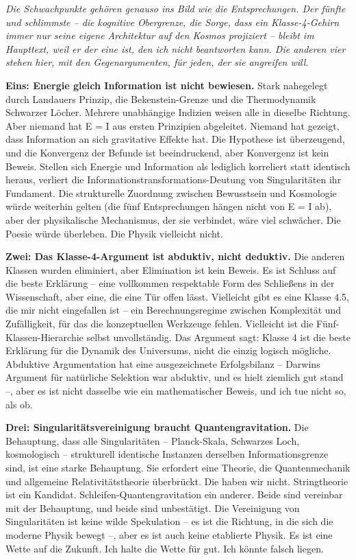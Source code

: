 \documentclass[11pt, twoside, openright]{book}
\begin{document}
\textit{Die Schwachpunkte gehören genauso ins Bild wie die Entsprechungen. Der fünfte und schlimmste -- die kognitive Obergrenze, die Sorge, dass ein Klasse-4-Gehirn immer nur seine eigene Architektur auf den Kosmos projiziert -- bleibt im Haupttext, weil er der eine ist, den ich nicht beantworten kann. Die anderen vier stehen hier, mit den Gegenargumenten, für jeden, der sie angreifen will.}

\textbf{Eins: Energie gleich Information ist nicht bewiesen.} Stark nahegelegt durch Landauers Prinzip, die Bekenstein-Grenze und die Thermodynamik Schwarzer Löcher. Mehrere unabhängige Indizien weisen alle in dieselbe Richtung. Aber niemand hat E = I aus ersten Prinzipien abgeleitet. Niemand hat gezeigt, dass Information an sich gravitative Effekte hat. Die Hypothese ist überzeugend, und die Konvergenz der Befunde ist beeindruckend, aber Konvergenz ist kein Beweis. Stellen sich Energie und Information als lediglich korreliert statt identisch heraus, verliert die Informationstransformations-Deutung von Singularitäten ihr Fundament. Die strukturelle Zuordnung zwischen Bewusstsein und Kosmologie würde weiterhin gelten (die fünf Entsprechungen hängen nicht von E = I ab), aber der physikalische Mechanismus, der sie verbindet, wäre viel schwächer. Die Poesie würde überleben. Die Physik vielleicht nicht.

\textbf{Zwei: Das Klasse-4-Argument ist abduktiv, nicht deduktiv.} Die anderen Klassen wurden eliminiert, aber Elimination ist kein Beweis. Es ist Schluss auf die beste Erklärung -- eine vollkommen respektable Form des Schließens in der Wissenschaft, aber eine, die eine Tür offen lässt. Vielleicht gibt es eine Klasse 4.5, die mir nicht eingefallen ist -- ein Berechnungsregime zwischen Komplexität und Zufälligkeit, für das die konzeptuellen Werkzeuge fehlen. Vielleicht ist die Fünf-Klassen-Hierarchie selbst unvollständig. Das Argument sagt: Klasse 4 ist die beste Erklärung für die Dynamik des Universums, nicht die einzig logisch mögliche. Abduktive Argumentation hat eine ausgezeichnete Erfolgsbilanz -- Darwins Argument für natürliche Selektion war abduktiv, und es hielt ziemlich gut stand --, aber es ist nicht dasselbe wie ein mathematischer Beweis, und ich tue nicht so, als ob.

\textbf{Drei: Singularitätsvereinigung braucht Quantengravitation.} Die Behauptung, dass alle Singularitäten -- Planck-Skala, Schwarzes Loch, kosmologisch -- strukturell identische Instanzen derselben Informationsgrenze sind, ist eine starke Behauptung. Sie erfordert eine Theorie, die Quantenmechanik und allgemeine Relativitätstheorie überbrückt. Die haben wir nicht. Stringtheorie ist ein Kandidat. Schleifen-Quantengravitation ein anderer. Beide sind vereinbar mit der Behauptung, und beide sind unbestätigt. Die Vereinigung von Singularitäten ist keine wilde Spekulation -- es ist die Richtung, in die sich die moderne Physik bewegt --, aber es ist auch keine etablierte Physik. Es ist eine Wette auf die Zukunft. Ich halte die Wette für gut. Ich könnte falsch liegen.
\end{document}
